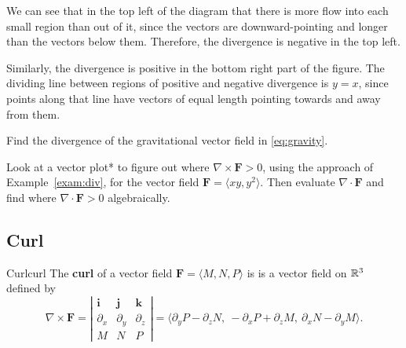 \documentclass[svgnames]{watsonbook}
\begin{document}
\begin{solution}
  We can see that in the top left of the diagram that there is more
  flow into each small region than out of it, since the vectors are
  downward-pointing and longer than the vectors below them. Therefore,
  the divergence is negative in the top left.

  Similarly, the divergence is positive in the bottom right part of
  the figure. The
  dividing line between regions of positive and negative divergence is
  $y = x$, since points along that line have vectors of equal length
  pointing towards and away from them.
\end{solution}

\begin{exercise}{}{}
  Find the divergence of the gravitational vector field in
  \eqref{eq:gravity}. 
\end{exercise}

\begin{exercise}{}{}
Look
  at a vector plot*  to figure out where $\nabla \times \mathbf{F} >
  0$, using the approach of 
  Example~\ref{exam:div}, for the vector field $\mathbf{F} = \langle xy, y^2
  \rangle$. Then evaluate $\nabla \cdot \mathbf{F}$ and find where
  $\nabla \cdot \mathbf{F} > 0$ algebraically. 
\end{exercise}

\subsection{Curl}


\begin{defn}{Curl}{curl}
  The \textbf{curl} of a vector field $\mathbf{F} = \langle M, N, P \rangle$ is
  is a vector field on $\mathbb{R}^3$ defined by \renewcommand\arraystretch{1.4}
  \[
    \nabla \times \mathbf{F} =
    \left|
      \begin{array}{ccc}
        \mathbf{i} & \mathbf{j} & \mathbf{k} \\
        \partial_x  & \partial_y & \partial_z \\
              M         &       N       &      P
      \end{array} 
    \right| = \big\langle \partial_y P - \partial_z N, \:
    -\partial_x P  + \partial_z M, \:
    \partial_x N - \partial_y M \big\rangle. 
  \]
\end{defn}
\end{document}
